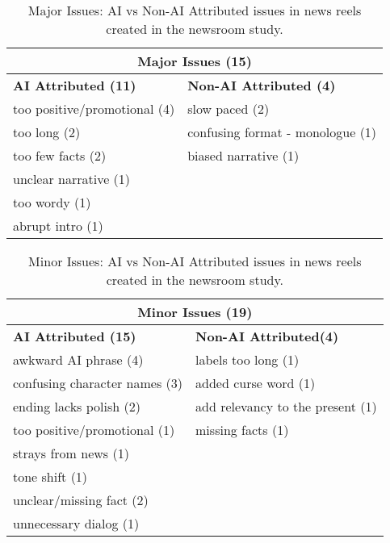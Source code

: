 \begin{table}
\centering
\begin{adjustbox}{width=0.46\textwidth}
\begin{tabular}{|l|l|}
\hline
\multicolumn{2}{|c|}{\textbf{Major Issues (15)}} \\ \hline
\textbf{AI Attributed (11)} & \textbf{Non-AI Attributed (4)}        \\ \hline
too positive/promotional (4)                & slow paced (2)                        \\ 
too long (2)                                & confusing format - monologue (1)       \\ 
too few facts (2)                           & biased narrative (1)                      \\ 
unclear narrative (1)                       &                                       \\ 
too wordy (1)                               &                                       \\ 
abrupt intro (1)                            &                                       \\ \hline
\end{tabular}
\end{adjustbox}
\caption{Major Issues: AI vs Non-AI Attributed issues in news reels created in the newsroom study.}
\label{major_issues}
\end{table}



\begin{table}
\centering
\begin{adjustbox}{width=0.46\textwidth}
\begin{tabular}{|l|l|}
\hline
\multicolumn{2}{|c|}{\textbf{Minor Issues (19)}} \\ \hline
\textbf{AI Attributed (15)}          & \textbf{Non-AI Attributed(4)}                  \\ \hline
awkward AI phrase (4)                & labels too long (1)                  \\ 
confusing character names (3)        & added curse word (1)                 \\ 
ending lacks polish (2)              & add relevancy to the present (1)     \\ 
too positive/promotional (1)         & missing facts (1)                    \\ 
strays from news (1)                 &                                      \\ 
tone shift (1)                       &                                      \\ 
unclear/missing fact (2)             &                                      \\ 
unnecessary dialog (1)               &                                      \\ \hline
\end{tabular}
\end{adjustbox}
\caption{Minor Issues: AI vs Non-AI Attributed issues in news reels created in the newsroom study.}
\label{minor_issues}
\end{table}

